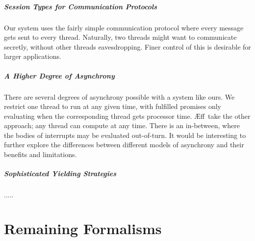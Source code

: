 \documentclass[msc,deptreport,cs]{infthesis} %
\newcommand\aeff{{\AE}ff\xspace}
\begin{document}
\paragraph*{Session Types for Communication Protocols}
Our system uses the fairly simple communication protocol where every message
gets sent to every thread. Naturally, two threads might want to communicate
secretly, without other threads eavesdropping. Finer control of this is
desirable for larger applications.

\paragraph*{A Higher Degree of Asynchrony}
There are several degrees of asynchrony possible with a system like ours. We
restrict one thread to run at any given time, with fulfilled promises only
evaluating when the corresponding thread gets processor time. \aeff~take the
other approach; any thread can compute at any time. There is an in-between,
where the bodies of interrupts may be evaluated out-of-turn. It would be
interesting to further explore the differences between different models of
asynchrony and their benefits and limitations.

\paragraph*{Sophisticated Yielding Strategies}
.....








\appendix

\chapter{Remaining Formalisms}
\end{document}
